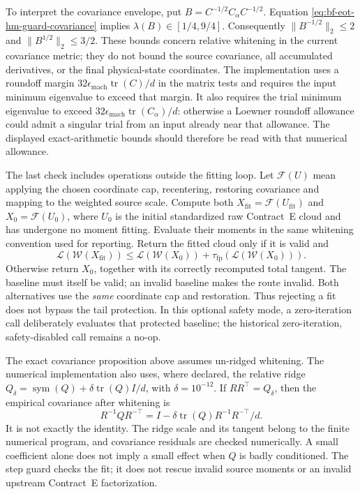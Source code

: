 To interpret the covariance envelope, put
\(B=C^{-1/2}C_\alpha C^{-1/2}\).  Equation
\eqref{eq:bf-eot-hm-guard-covariance} implies
\(\lambda(B)\in[1/4,9/4]\).  Consequently
\(\lVert B^{-1/2}\rVert_2\le2\) and
\(\lVert B^{1/2}\rVert_2\le3/2\).  These bounds concern relative whitening
in the current covariance metric; they do not bound the source covariance,
all accumulated derivatives, or the final physical-state coordinates.
The implementation uses a roundoff margin
\(32\epsilon_{\mathrm{mach}}\operatorname{tr}(C)/d\) in the matrix tests and
requires the input minimum eigenvalue to exceed that margin.  It also requires
the trial minimum eigenvalue to exceed
\(32\epsilon_{\mathrm{mach}}\operatorname{tr}(C_\alpha)/d\): otherwise a
Loewner roundoff allowance could admit a singular trial from an input already
near that allowance.  The displayed
exact-arithmetic bounds should therefore be read with that numerical allowance.

The last check includes operations outside the fitting loop.  Let
\(\mathcal F(U)\) mean applying the chosen coordinate cap, recentering,
restoring covariance and mapping to the weighted source scale.  Compute both
\(X_{\mathrm{fit}}=\mathcal F(U_{\mathrm{fit}})\) and
\(X_0=\mathcal F(U_0)\), where \(U_0\) is the initial standardized raw
Contract~E cloud and has undergone no moment fitting.  Evaluate their moments
in the same whitening convention used for reporting.  Return the fitted cloud
only if it is valid and
\begin{equation}
 \mathcal L(\mathcal W(X_{\mathrm{fit}}))
 \le \mathcal L(\mathcal W(X_0))+
             \tau_{\mathrm{fp}}(\mathcal L(\mathcal W(X_0))).
 \label{eq:bf-eot-hm-complete-map-check}
\end{equation}
Otherwise return \(X_0\), together with its correctly recomputed total tangent.
The baseline must itself be valid; an invalid baseline makes the route invalid.
Both alternatives use the \emph{same} coordinate cap and restoration.  Thus
rejecting a fit does not bypass the tail protection.  In this optional safety
mode, a zero-iteration call deliberately evaluates that protected baseline;
the historical zero-iteration, safety-disabled call remains a no-op.

The exact covariance proposition above assumes un-ridged whitening.  The
numerical implementation also uses, where declared, the relative ridge
\(Q_\delta=\operatorname{sym}(Q)+\delta\operatorname{tr}(Q)I/d\), with
\(\delta=10^{-12}\).  If \(RR^\top=Q_\delta\), then the empirical covariance
after whitening is
\[
 R^{-1}QR^{-\top}
 =I-\delta\operatorname{tr}(Q)R^{-1}R^{-\top}/d.
\]
It is not exactly the identity.  The ridge scale and its tangent belong to the
finite numerical program, and covariance residuals are checked numerically.
A small coefficient alone does not imply a small effect when \(Q\) is badly
conditioned.  The step guard checks the fit; it does not rescue invalid source
moments or an invalid upstream Contract~E factorization.

